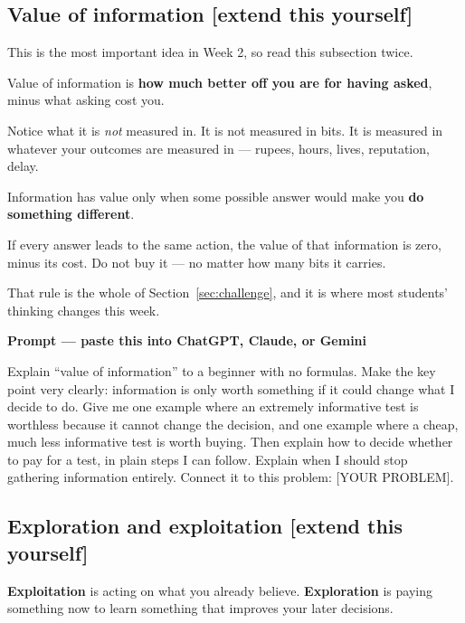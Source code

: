\documentclass[11pt,a4paper]{article}
\newcommand{\keyword}[1]{\textbf{#1}}
\newcommand{\boxtitle}[1]{{\bfseries #1}\par\vspace{2pt}}
\newcommand{\extend}{\hfill{\footnotesize\sffamily\color{sbaccent}[extend this yourself]}}
\newenvironment{learnprompt}
  {\begin{sbbox}\boxtitle{Prompt --- paste this into ChatGPT, Claude, or Gemini}%
   \ttfamily\small\raggedright}
  {\end{sbbox}}
\begin{document}
\subsection{Value of information \extend}

This is the most important idea in Week 2, so read this subsection twice.

Value of information is \textbf{how much better off you are for having asked}, minus what asking
cost you.

Notice what it is \emph{not} measured in. It is not measured in bits. It is measured in whatever
your outcomes are measured in --- rupees, hours, lives, reputation, delay.

\begin{sbrule}
Information has value only when some possible answer would make you \textbf{do something
different}.

If every answer leads to the same action, the value of that information is zero, minus its cost.
Do not buy it --- no matter how many bits it carries.
\end{sbrule}

That rule is the whole of Section~\ref{sec:challenge}, and it is where most students' thinking
changes this week.

\begin{learnprompt}
Explain ``value of information'' to a beginner with no formulas. Make the key point very clearly:
information is only worth something if it could change what I decide to do. Give me one example
where an extremely informative test is worthless because it cannot change the decision, and one
example where a cheap, much less informative test is worth buying. Then explain how to decide
whether to pay for a test, in plain steps I can follow. Explain when I should stop gathering
information entirely. Connect it to this problem: [YOUR PROBLEM].
\end{learnprompt}

\subsection{Exploration and exploitation \extend}

\keyword{Exploitation} is acting on what you already believe. \keyword{Exploration} is paying
something now to learn something that improves your later decisions.
\end{document}
